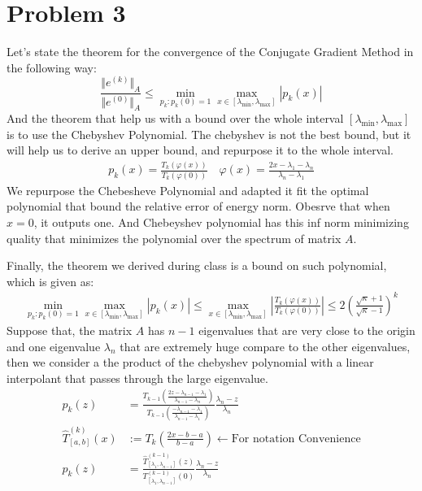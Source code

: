 \documentclass[]{article}
\begin{document}
\section*{Problem 3}
    Let's state the theorem for the convergence of the Conjugate Gradient Method in the following way: 
    $$
    \frac{\Vert e^{(k)}\Vert_A}{\Vert e^{(0)}\Vert_A} \le 
    \min_{p_k: p_k(0) = 1}\max_{x\in [\lambda_{\text{min}}, \lambda_{\text{max}}]} |p_k(x)|
    $$
    And the theorem that help us with a bound over the whole interval $[\lambda_{\min},\lambda_{\max}]$ is to use the Chebyshev Polynomial. The chebyshev is not the best bound, but it will help us to derive an upper bound, and repurpose it to the whole interval. 
    \begin{align*}\tag{3.1}\label{eqn:3.1}
        p_k(x) = \frac{T_k(\varphi(x))}{T_k(\varphi(0))}
        \quad \varphi(x) = \frac{2x - \lambda_1 - \lambda_n}{\lambda_n - \lambda_1}
    \end{align*}
    We repurpose the Chebesheve Polynomial and adapted it fit the optimal polynomial that bound the relative error of energy norm. Obesrve that when $x = 0$, it outputs one. And Chebeyshev polynomial has this inf norm minimizing quality that minimizes the polynomial over the spectrum of matrix $A$. 
    \par
    Finally, the theorem we derived during class is a bound on such polynomial, which is given as: 
    \begin{align*}\tag{3.2}\label{eqn:3.2} 
        \min_{p_k: p_k(0) = 1}\max_{x\in [\lambda_{\text{min}}, \lambda_{\text{max}}]} |p_k(x)| 
        \le
        \max_{x\in[\lambda_{\min}, \lambda_{\max}]}
        \left|
            \frac{T_k(\varphi(x))}{T_k(\varphi(0))} 
        \right|
        \le
        2 \left(
        \frac{\sqrt{\kappa} + 1}{\sqrt{\kappa} - 1}
        \right)^k
    \end{align*}
    Suppose that, the matrix $A$ has $n - 1$ eigenvalues that are very close to the origin and one eigenvalue $\lambda_n$ that are extremely huge compare to the other eigenvalues, then we consider a the product of the chebyshev polynomial with a linear interpolant that passes through the large eigenvalue. 
    \begin{align*}\tag{3.3}\label{eqn:3.3}
        p_k(z) &= 
        \frac
        {
            T_{k-1}\left(
                \frac{2z - \lambda_{n-1} - \lambda_1}{\lambda_{n-1} -\lambda_n}
            \right)
        }{
            T_{k-1}\left(
                \frac{
                    -\lambda_{n-1} - \lambda_1
                }
                {
                    \lambda_{n-1} - \lambda_1
                }
            \right)
        }\frac{\lambda_n - z}{\lambda_n}
        \\
        \hat{T}_{[a, b]}^{(k)}(x) &:= 
        T_k\left(
            \frac{2x - b - a}{b - a}
        \right) \leftarrow \text{For notation Convenience}
        \\
        p_k(z) &= 
        \frac
        {
            \hat{T}_{[\lambda_1, \lambda_{n - 1}]}^{(k - 1)}
            \left(
                z
            \right)
        }{
            T^{(k - 1)}_{[\lambda_1, \lambda_{n - 1}]}
            \left(
                0
            \right)
        }\frac{\lambda_n - z}{\lambda_n}
    \end{align*}
\end{document}
